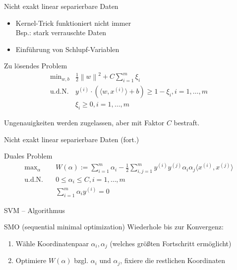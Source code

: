 \documentclass[xcolor={dvipsnames,svgnames},draft]{beamer}
\newcommand{\inner}[2]{\langle{} #1, #2 \rangle{}}
\newcommand{\norm}[1]{\left\lVert#1\right\rVert}
\begin{document}
\begin{frame}{Nicht exakt linear separierbare Daten}
  \begin{itemize}
  \item Kernel-Trick funktioniert nicht immer \\
  Bsp.: stark verrauschte Daten
  \item Einführung von Schlupf-Variablen
  \end{itemize}

  \begin{exampleblock}{Zu lösendes Problem}
    \[
      \begin{array}{rl}
        \text{min}_{w,b} & \frac{1}{2}\norm{w}^2 + C\sum_{i=1}^m \xi_i \\
        \text{u.d.N.} & y^{(i)} \cdot (\inner{w}{x^{(i)}} + b) \geq 1 - \xi_i, 
                        i = 1, \ldots, m \\
                         & \xi_i \geq 0, i = 1, \ldots, m
      \end{array}
    \]
  \end{exampleblock}

  Ungenauigkeiten werden zugelassen, aber mit Faktor $C$ bestraft.
\end{frame}

\begin{frame}{Nicht exakt linear separierbare Daten (fort.)}
  \begin{exampleblock}{Duales Problem}
    \vspace{-1em}
    \begin{align*}
        \text{max}_{\alpha} \quad& W(\alpha) := \sum_{i=1}^m\alpha_i 
                              - \frac{1}{2}\sum_{i,j=1}^m y^{(i)}y^{(j)}\alpha_i\alpha_j\inner{x^{(i)}}{x^{(j)}}  \\
        \text{u.d.N.} \quad& 0 \leq \alpha_i \leq C, i = 1, \ldots, m \\
                            & \sum_{i=1}^m \alpha_i y^{(i)} = 0
    \end{align*}
  \end{exampleblock}
\end{frame}

\begin{frame}{SVM -- Algorithmus}

  \begin{block}{SMO (sequential minimal optimization) \cite{PlattSMO}}
    Wiederhole bis zur Konvergenz:
    \begin{enumerate}
    \item Wähle Koordinatenpaar $\alpha_i,\alpha_j$ (welches größten Fortschritt
      ermöglicht)
    \item Optimiere $W(\alpha)$ bzgl. $\alpha_i$ und $\alpha_j$, fixiere die
      restlichen Koordinaten
    \end{enumerate}
  \end{block}

\end{frame}
\end{document}

